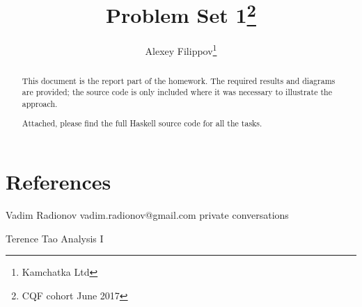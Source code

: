 \documentclass{tufte-handout}
\title{Problem Set 1\thanks{CQF cohort June 2017}}
\author{Alexey Filippov\thanks{Kamchatka Ltd}}
\begin{document}
\maketitle%
\begin{abstract}
This document is the report part of the homework.
The required results and diagrams are provided; the source
code is only included where it was necessary to illustrate the approach.

Attached, please find the full Haskell source code for all the tasks.
\end{abstract}














\section{ References }

Vadim Radionov vadim.radionov@gmail.com private conversations

Terence Tao Analysis I





\end{document}
